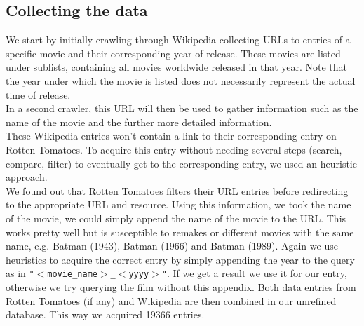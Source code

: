 \documentclass{article}
\begin{document}
\subsection{Collecting the data}
    We start by initially crawling through Wikipedia collecting URLs to entries of a specific movie and their corresponding year of release. These movies are listed under sublists, containing all movies worldwide released in that year. Note that the year under which the movie is listed does not necessarily represent the actual time of release.\\
    In a second crawler, this URL will then be used to gather information such as the name of the movie and the further more detailed information. \\
    These Wikipedia entries won't contain a link to their corresponding entry on Rotten Tomatoes. To acquire this entry without needing several steps (search, compare, filter) to eventually get to the corresponding entry, we used an heuristic approach.\\
    We found out that Rotten Tomatoes filters their URL entries before redirecting to the appropriate URL and resource. Using this information, we took the name of the movie, we could simply append the name of the movie to the URL.
    This works pretty well but is susceptible to remakes or different movies with the same name, e.g. Batman (1943), Batman (1966) and Batman (1989)\cite{batman_remakes}.
    Again we use heuristics to acquire the correct entry by simply appending the year to the query as in \texttt{"$<$movie\_name$>$\_$<$yyyy$>$"}. If we get a result we use it for our entry, otherwise we try querying the film without this appendix.
    Both data entries from Rotten Tomatoes (if any) and Wikipedia are then combined in our unrefined database. This way we acquired 19366 entries. %
\end{document}
